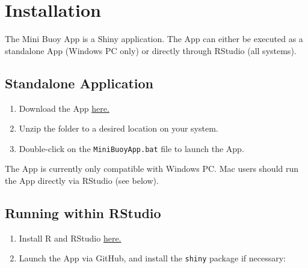 \documentclass[
  letterpaper,
  DIV=11,
  numbers=noendperiod]{scrreprt}
\providecommand{\tightlist}{%
  \setlength{\itemsep}{0pt}\setlength{\parskip}{0pt}}\usepackage{longtable,booktabs,array}
\begin{document}
\hypertarget{installation}{%
\section{Installation}\label{installation}}

The Mini Buoy App is a Shiny application. The App can either be executed
as a standalone App (Windows PC only) or directly through RStudio (all
systems).

\hypertarget{standalone-application}{%
\subsection{Standalone Application}\label{standalone-application}}

\begin{enumerate}
\def\labelenumi{\arabic{enumi}.}
\tightlist
\item
  Download the App
  \href{https://cloudstore.zih.tu-dresden.de/index.php/s/7ES7xq2tzMBfNm5}{here.}
\item
  Unzip the folder to a desired location on your system.
\item
  Double-click on the \texttt{MiniBuoyApp.bat} file to launch the App.
\end{enumerate}

\begin{tcolorbox}[enhanced jigsaw, bottomrule=.15mm, leftrule=.75mm, bottomtitle=1mm, breakable, opacityback=0, colback=white, left=2mm, toprule=.15mm, opacitybacktitle=0.6, arc=.35mm, colframe=quarto-callout-note-color-frame, toptitle=1mm, titlerule=0mm, colbacktitle=quarto-callout-note-color!10!white, coltitle=black, title=\textcolor{quarto-callout-note-color}{\faInfo}\hspace{0.5em}{Note}, rightrule=.15mm]

The App is currently only compatible with Windows PC. Mac users should
run the App directly via RStudio (see below).

\end{tcolorbox}

\hypertarget{running-within-rstudio}{%
\subsection{Running within RStudio}\label{running-within-rstudio}}

\begin{enumerate}
\def\labelenumi{\arabic{enumi}.}
\tightlist
\item
  Install R and RStudio
  \href{https://posit.co/download/rstudio-desktop/}{here.}
\item
  Launch the App via GitHub, and install the \texttt{shiny} package if
  necessary:
\end{enumerate}
\end{document}
